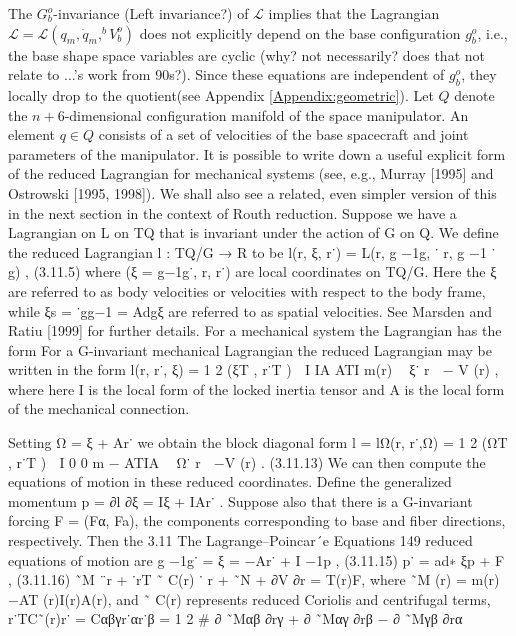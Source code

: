 
The $G^o_b$-invariance (Left invariance?) of $\mathcal{L}$ implies that the Lagrangian $\mathcal{L} = \mathcal{L}(q_m, \dot{q}_m,^bV^o_b)$ does not explicitly depend on the base configuration $g^o_b$, i.e., the base shape space variables are cyclic (why? not necessarily? does that not relate to ...'s work from 90s?). %
Since these equations are independent of $g^o_b$, they locally drop to the quotient(see Appendix \ref{Appendix:geometric}).
Let $Q$ denote the $n+6$-dimensional configuration manifold of the space manipulator. An element $q \in Q$ consists of a set of velocities of the base spacecraft and joint parameters of the manipulator.
It is possible to write
down a useful explicit form of the reduced Lagrangian for mechanical systems
(see, e.g., Murray [1995] and Ostrowski [1995, 1998]). We shall also
see a related, even simpler version of this in the next section in the context
of Routh reduction.
Suppose we have a Lagrangian on L on TQ that is invariant under the
action of G on Q. We define the reduced Lagrangian l : TQ/G → R to be
l(r, ξ, r˙) = L(r, g
−1g, ˙ r, g
−1 ˙ g) , (3.11.5)
where (ξ = g−1g˙, r, r˙) are local coordinates on TQ/G. Here the ξ are referred
to as body velocities or velocities with respect to the body frame,
while ξs = ˙gg−1 = Adgξ are referred to as spatial velocities. See Marsden
and Ratiu [1999] for further details.
For a mechanical system the Lagrangian has the form
For a G-invariant mechanical Lagrangian the reduced
Lagrangian may be written in the form
l(r, r˙, ξ) =
1
2
(ξT , r˙T )

I IA
ATI m(r)

ξ˙
r

− V (r) ,
where here I is the local form of the locked inertia tensor and A is the local
form of the mechanical connection.

Setting Ω = ξ + Ar˙ we obtain the block diagonal form
l = lΩ(r, r˙,Ω) =
1
2
(ΩT , r˙T )

I 0
0 m − ATIA

Ω˙
r

−V (r) . (3.11.13)
We can then compute the equations of motion in these reduced coordinates.
Define the generalized momentum
p = ∂l
∂ξ
= Iξ + IAr˙ .
Suppose also that there is a G-invariant forcing F = (Fα, Fa), the components
corresponding to base and fiber directions, respectively. Then the
3.11 The Lagrange–Poincar´e Equations 149
reduced equations of motion are
g
−1g˙ = ξ = −Ar˙ + I
−1p , (3.11.15)
p˙ = ad∗
ξp + F , (3.11.16)
˜M
¨r + ˙rT ˜ C(r) ˙ r + ˜N + ∂V
∂r
= T(r)F,
where ˜M (r) = m(r)−AT (r)I(r)A(r), and ˜ C(r) represents reduced Coriolis
and centrifugal terms,
r˙TC˜(r)r˙ = Cαβγr˙αr˙β =
1
2
#
∂ ˜Mαβ
∂rγ + ∂ ˜Mαγ
∂rβ
− ∂ ˜Mγβ
∂rα

